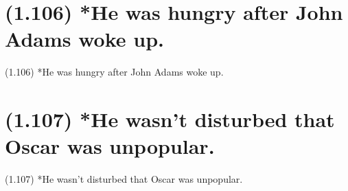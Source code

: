 \documentclass{article}
\begin{document}
\section*{(1.106) *He was hungry after John Adams woke up.}

\bigbreak
\begin{enumerate*}
\item[(1.106)] *He was hungry after John Adams woke up.
\end{enumerate*}
\bigbreak

\bigbreak
\begin{minipage}{\textwidth}
\end{minipage}
\bigbreak

\clearpage

%
%

\section*{(1.107) *He wasn't disturbed that Oscar was unpopular.}

\bigbreak
\begin{enumerate*}
\item[(1.107)] *He wasn't disturbed that Oscar was unpopular.
\end{enumerate*}
\bigbreak

\bigbreak
\begin{minipage}{\textwidth}
\end{minipage}
\bigbreak
\end{document}

